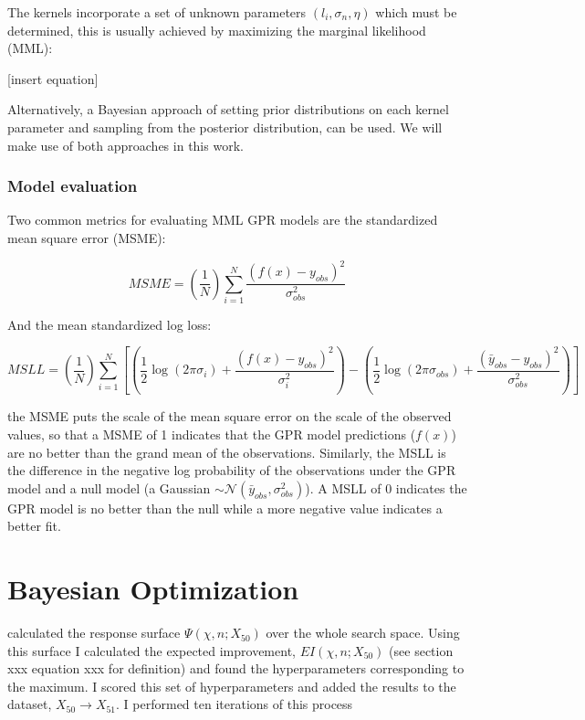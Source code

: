 The kernels incorporate a set of unknown parameters $({l_i },\sigma_n,\eta)$ which must be determined, this is usually achieved by maximizing the marginal likelihood (MML):

[insert equation]

Alternatively, a Bayesian approach of setting prior distributions on each kernel parameter and sampling from the posterior distribution, can be used. We will make use of both approaches in this work.  

\subsubsection{Model evaluation}
Two common metrics for evaluating MML GPR models are the standardized mean square error (MSME): 

\begin{equation}
M S M E=\left(\frac{1}{N}\right) \sum_{i=1}^{N} \frac{\left(f(x)-y_{o b s}\right)^{2}}{\sigma_{o b s}^{2}}
\end{equation}

And the mean standardized log loss: 

\begin{equation}
M S L L=\left(\frac{1}{N}\right) \sum_{i=1}^{N}\left[\left(\frac{1}{2} \log \left(2 \pi \sigma_{i}\right)+\frac{\left(f(x)-y_{o b s}\right)^{2}}{\sigma_{i}^{2}}\right)-\left(\frac{1}{2} \log \left(2 \pi \sigma_{o b s}\right)+\frac{\left(\bar{y}_{o b s}-y_{o b s}\right)^{2}}{\sigma_{o b s}^{2}}\right)\right]
\end{equation}

the MSME puts the scale of the mean square error on the scale of the observed values, so that a MSME of 1 indicates that the GPR model predictions ($f(x)$) are no better than the grand mean of the observations. Similarly, the MSLL is the difference in the negative log probability  of the observations under the GPR model and a null model (a Gaussian $\sim \mathcal{N}(\bar{y}_{obs},\sigma_{obs}^2 )$). A MSLL of $0$ indicates the GPR model is no better than the null while a more negative value indicates a better fit. 

\section{Bayesian Optimization}\label{sec:BO}

calculated the response surface $\Psi(\chi, n;X_{50})$ over the whole search space. Using this surface I calculated the expected improvement, $EI(\chi, n;X_{50})$ (see section xxx equation xxx for definition) and found the hyperparameters corresponding to the maximum. I scored this set of hyperparameters and added the results to the dataset, $X_{50} \rightarrow X_{51}$. I performed ten iterations of this process 